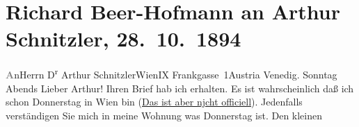 

         
         \renewcommand{\erwaehntePersonen}{Personen: Leopold von Andrian-Werburg, Moritz Mayer}
         \renewcommand{\erwaehnteOrte}{Orte: Bahnhof, Frankgasse, Grand Hotel Bauer-Grünwald, IX., Alsergrund, Venedig, Wien, Österreich}
         \renewcommand{\erwaehnteWerke}{Werke: Das Märchen. Schauspiel in drei Aufzügen, Die Schmetterlingsschlacht. Komödie in 4 Akten}
               \section[Richard Beer-Hofmann an Arthur Schnitzler, 28. 10. 1894]{ Richard Beer-Hofmann an Arthur Schnitzler, 28. 10. 1894}\nopagebreak{}\rehead{ }\begin{ledgroupsized}[t]{13cm}\normalsize\beginnumbering \toendnotes[C]{\smallbreak\pagebreak[2]} 
\toendnotes[C]{\smallbreak}\pstart{}{\pb}\textcolor{gray}{\textbf{A}}n\pend{}\pstart{}Herrn D\textsuperscript{r} Arthur Schnitzler\pend{}\pstart{}Wien\pend{}\pstart{}IX Frankgasse 1\pend{}\pstart{}Austria\pend{}{\bigskip}\pstart
           \raggedleft{}{\pb}Venedig. Sonntag
                     Abends\pend
           \pstart
           Lieber Arthur! Ihren Brief hab ich erhalten. Es ist wahrscheinlich
               daß ich schon Donnerstag in Wien bin
                  (\uline{Das ist aber njcht officiell}). Jedenfalls
               verständigen Sie mich in meine Wohnung was Donnerstag ist. Den kleinen

\end{ledgroupsized}

